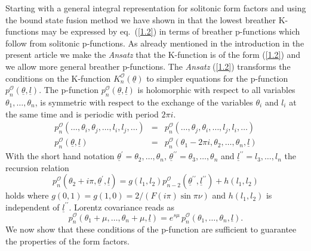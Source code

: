 \documentclass[a4paper,a4paper]{article}
\begin{document}
Starting with a general integral representation for solitonic form factors
and using the bound state fusion method we have shown in \cite{BK} that the
lowest breather K-functions may be expressed by eq.~(\ref{1.2}) in terms of
breather p-functions which follow from solitonic p-functions. As already
mentioned in the introduction in the present article we make the \emph{%
Ansatz }that the K-function is of the form (\ref{1.2}) and we allow more
general breather p-functions. The \emph{Ansatz }(\ref{1.2}) transforms the
conditions on the K-function $K_{n}^{\mathcal{O}}(\underline{\theta })$ to
simpler equations for the p-function $p_{n}^{\mathcal{O}}(\underline{\theta }%
,\underline{l})$. The p-function $p_{n}^{\mathcal{O}}(\underline{\theta },%
\underline{l})$ is holomorphic with respect to all variables $\theta
_{1},\dots ,\theta _{n}$, is symmetric with respect to the exchange of the
variables $\theta _{i}$ and $l_{i}$ at the same time and is periodic with
period $2\pi i$. 
\begin{eqnarray}
p_{n}^{\mathcal{O}}(\dots ,\theta _{i},\theta _{j},\dots ,l_{i},l_{j},\dots
) &=&p_{n}^{\mathcal{O}}(\dots ,\theta _{j},\theta _{i},\dots
,l_{j},l_{i},\dots )  \label{pp1} \\
p_{n}^{\mathcal{O}}(\underline{\theta },\underline{l}) &=&p_{n}^{\mathcal{O}%
}(\theta _{1}-2\pi i,\theta _{2},\dots ,\theta _{n},\underline{l})
\label{pp2}
\end{eqnarray}
With the short hand notation $\underline{\theta }^{\prime }=\theta
_{2},\dots ,\theta _{n},\,\underline{\theta }^{\prime \prime }=\theta
_{3},\dots ,\theta _{n}$ and $\underline{l}^{\prime \prime }=l_{3},\dots
,l_{n}$ the recursion relation 
\begin{equation}
p_{n}^{\mathcal{O}}(\theta _{2}+i\pi ,\underline{\theta }^{\prime },%
\underline{l})=g(l_{1},l_{2})p_{n-2}^{\mathcal{O}}(\underline{\theta }%
^{\prime \prime },\underline{l}^{\prime \prime })+h(l_{1},l_{2})  \label{pp3}
\end{equation}
holds where $g(0,1)=g(1,0)=2/(F(i\pi )\sin \pi \nu )$ and $h(l_{1},l_{2})$
is independent of $\underline{l}^{\prime \prime }$. Lorentz covariance reads
as 
\begin{equation}
p_{n}^{\mathcal{O}}(\theta _{1}+\mu ,\dots ,\theta _{n}+\mu ,\underline{l}%
)=e^{s\mu }\,p_{n}^{\mathcal{O}}(\theta _{1},\dots ,\theta _{n},\underline{l}%
).  \label{pp5}
\end{equation}
We now show that these conditions of the p-function are sufficient to
guarantee the properties of the form factors.
\end{document}
